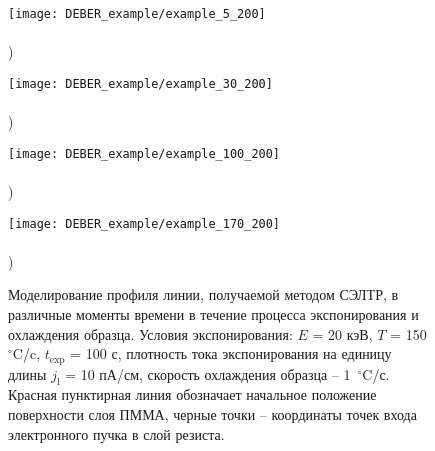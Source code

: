 \begin{figure}[t!]
	\begin{minipage}{0.48\textwidth}
		\texttt{[image: DEBER\_example/example\_5\_200]} \\
		\vspace{-13em} \\ ) \\ \vspace{13em}
	\end{minipage}
	\begin{minipage}{0.48\textwidth}
		\texttt{[image: DEBER\_example/example\_30\_200]} \\
		\vspace{-13em} \\ ) \\ \vspace{13em}
	\end{minipage}
	
	\vspace{-3em}
	
	\begin{minipage}{0.48\textwidth}
		\texttt{[image: DEBER\_example/example\_100\_200]} \\
		\vspace{-13em} \\ ) \\ \vspace{13em}
	\end{minipage}
	\begin{minipage}{0.48\textwidth}
		\texttt{[image: DEBER\_example/example\_170\_200]} \\
		\vspace{-13em} \\ ) \\ \vspace{13em}
	\end{minipage}
	\vspace{-3em}
	\caption{Моделирование профиля линии, получаемой методом СЭЛТР, в различные моменты времени в течение процесса экспонирования и охлаждения образца. Условия экспонирования: $E$ = 20 кэВ, $T$ = 150 $^{\circ}$C/c, $t_\mathrm{exp}$ = 100 с, плотность тока экспонирования на единицу длины $j_\mathrm{l}$ = 10 пА/см, скорость охлаждения образца -- 1~$^{\circ}$C/с. Красная пунктирная линия обозначает начальное положение поверхности слоя ПММА, черные точки -- координаты точек входа электронного пучка в слой резиста.}
	\label{fig:DEBER_example}
\end{figure}

